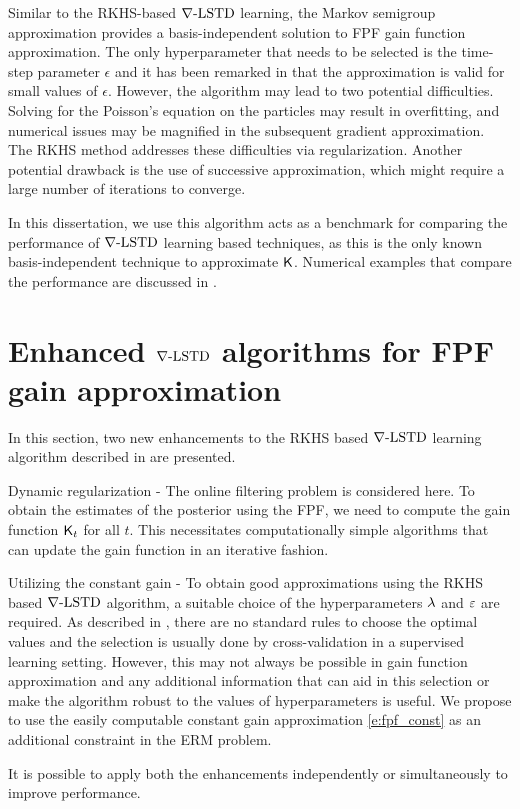 Similar to the RKHS-based $\nabla\text{-LSTD}$ learning, the Markov semigroup approximation provides a basis-independent solution to FPF gain function approximation. The only hyperparameter that needs to be selected is the time-step parameter $\epsilon$ and it has been remarked in \cite{tagmeh16} that the approximation is valid for small values of $\epsilon$. However, the algorithm may lead to two potential difficulties. Solving for the Poisson's equation on the particles may result in overfitting,  and numerical issues may be magnified in the subsequent gradient approximation. The RKHS method addresses these difficulties via regularization. Another potential drawback is the use of successive approximation, which might require a large number of iterations to converge. 

In this dissertation, we use this algorithm acts as a benchmark for comparing the performance of $\nabla\text{-LSTD}$ learning based techniques, as this is the only known basis-independent technique to approximate $\text{\sf K}$. Numerical examples that compare the performance are discussed in .


\section{Enhanced $\nabla\text{-LSTD}$ algorithms for FPF gain approximation} 
\label{s:fpf_rkhs_improvements}
In this section, two new enhancements to the RKHS based $\nabla\text{-LSTD}$ learning algorithm described in  are presented. 
\begin{romannum}
\item Dynamic regularization - The online filtering problem is considered here. To obtain the estimates of the posterior using the FPF, we need to compute the gain function $\text{\sf K}_t$ for all $t$. This necessitates computationally simple algorithms that can update the gain function in an iterative fashion.
\item Utilizing the constant gain - To obtain good approximations using the RKHS based $\nabla\text{-LSTD}$ algorithm, a suitable choice of the hyperparameters $\lambda$ and $\varepsilon$ are required. As described in , there are no standard rules to choose the optimal values and the selection is usually done by cross-validation in a supervised learning setting. However, this may not always be possible in gain function approximation and any additional information that can aid in this selection or make the algorithm robust to the values of hyperparameters is useful. We propose to use the easily computable constant gain approximation \eqref{e:fpf_const} as an additional constraint in the ERM problem. 
\end{romannum}
It is possible to apply both the enhancements independently or simultaneously to improve performance. 

